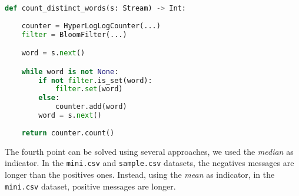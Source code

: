 \documentclass{article}
\begin{document}
\begin{lstlisting}[language=Python,caption="Pseudo-Code for the third point",label={lst:third}]
def count_distinct_words(s: Stream) -> Int:
    
    counter = HyperLogLogCounter(...)
    filter = BloomFilter(...)

    word = s.next()

    while word is not None:
        if not filter.is_set(word):
            filter.set(word)
        else:
            counter.add(word)
        word = s.next()
    
    return counter.count()

\end{lstlisting}

\noindent The fourth point can be solved using several approaches, we used the \textit{median} as indicator. In the \verb+mini.csv+ and \verb+sample.csv+ datasets, the negatives messages are longer than the positives ones.
Instead, using the \textit{mean} as indicator, in the \verb+mini.csv+ dataset, positive messages are longer.
\end{document}
